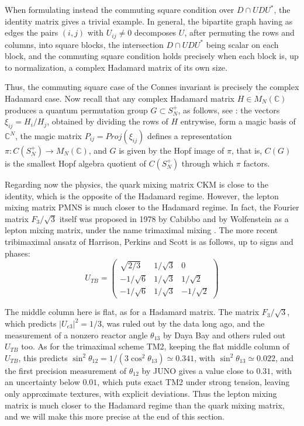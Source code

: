 \documentclass[11pt]{amsart}
\theoremstyle{definition}
\begin{document}
When formulating instead the commuting square condition over $D\cap UDU^*$, the identity matrix gives a trivial example. In general, the bipartite graph having as edges the pairs $(i,j)$ with $U_{ij}\neq0$ decomposes $U$, after permuting the rows and columns, into square blocks, the intersection $D\cap UDU^*$ being scalar on each block, and the commuting square condition holds precisely when each block is, up to normalization, a complex Hadamard matrix of its own size.

Thus, the commuting square case of the Connes invariant is precisely the complex Hadamard case. Now recall that any complex Hadamard matrix $H\in M_N(\mathbb C)$ produces a quantum permutation group $G\subset S_N^+$, as follows, see \cite{bhm}: the vectors $\xi_{ij}=H_i/H_j$, obtained by dividing the rows of $H$ entrywise, form a magic basis of $\mathbb C^N$, the magic matrix $P_{ij}=Proj(\xi_{ij})$ defines a representation $\pi:C(S_N^+)\to M_N(\mathbb C)$, and $G$ is given by the Hopf image of $\pi$, that is, $C(G)$ is the smallest Hopf algebra quotient of $C(S_N^+)$ through which $\pi$ factors.

Regarding now the physics, the quark mixing matrix CKM is close to the identity, which is the opposite of the Hadamard regime. However, the lepton mixing matrix PMNS is much closer to the Hadamard regime. In fact, the Fourier matrix $F_3/\sqrt{3}$ itself was proposed in 1978 by Cabibbo and by Wolfenstein as a lepton mixing matrix, under the name trimaximal mixing \cite{cab,wol}. The more recent tribimaximal ansatz of Harrison, Perkins and Scott \cite{hps} is as follows, up to signs and phases:
$$U_{TB}=\begin{pmatrix}\sqrt{2/3}&1/\sqrt{3}&0\\ -1/\sqrt{6}&1/\sqrt{3}&1/\sqrt{2}\\ -1/\sqrt{6}&1/\sqrt{3}&-1/\sqrt{2}\end{pmatrix}$$

The middle column here is flat, as for a Hadamard matrix. The matrix $F_3/\sqrt{3}$, which predicts $|U_{e3}|^2=1/3$, was ruled out by the data long ago, and the measurement of a nonzero reactor angle $\theta_{13}$ by Daya Bay and others \cite{dby} ruled out $U_{TB}$ too. As for the trimaximal scheme TM2, keeping the flat middle column of $U_{TB}$, this predicts $\sin^2\theta_{12}=1/(3\cos^2\theta_{13})\simeq0.341$, with $\sin^2\theta_{13}\simeq0.022$, and the first precision measurement of $\theta_{12}$ by JUNO \cite{jun} gives a value close to $0.31$, with an uncertainty below $0.01$, which puts exact TM2 under strong tension, leaving only approximate textures, with explicit deviations. Thus the lepton mixing matrix is much closer to the Hadamard regime than the quark mixing matrix, and we will make this more precise at the end of this section.
\end{document}
